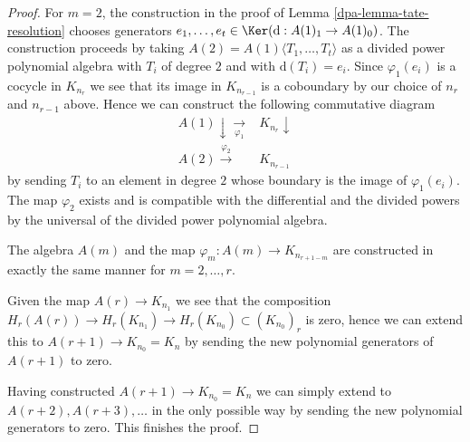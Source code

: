 \begin{proof}
\medskip\noindent
For $m = 2$, the construction in the proof of Lemma \ref{dpa-lemma-tate-resolution}
chooses generators $e_1, \ldots, e_t \in \Ker(\text{d} : A(1)_1 \to A(1)_0)$.
The construction proceeds by taking
$A(2) = A(1)\langle T_1, \ldots, T_t\rangle$
as a divided power polynomial algebra with $T_i$ of degree $2$
and with $\text{d}(T_i) = e_i$.
Since $\varphi_1(e_i)$ is a cocycle in $K_{n_r}$
we see that its image in $K_{n_{r - 1}}$ is a coboundary by
our choice of $n_r$ and $n_{r - 1}$ above.
Hence we can construct the following commutative diagram
$$
\begin{array}{cc}A(1) \downarrow\underset{\varphi_1}{\longrightarrow} & K_{n_r} \downarrow \\ A(2) \overset{\varphi_2}{\longrightarrow} & K_{n_{r - 1}}\end{array}
$$
by sending $T_i$ to an element in degree $2$ whose boundary is the
image of $\varphi_1(e_i)$. The map $\varphi_2$ exists and is compatible
with the differential and the divided powers by the universal
of the divided power polynomial algebra.

\medskip\noindent
The algebra $A(m)$ and the map $\varphi_m : A(m) \to K_{n_{r + 1 - m}}$
are constructed in exactly the same manner for $m = 2, \ldots, r$.

\medskip\noindent
Given the map $A(r) \to K_{n_1}$ we see that the composition
$H_r(A(r)) \to H_r(K_{n_1}) \to H_r(K_{n_0}) \subset (K_{n_0})_r$
is zero, hence we can extend this to $A(r + 1) \to K_{n_0} = K_n$
by sending the new polynomial generators of $A(r + 1)$ to zero.

\medskip\noindent
Having constructed $A(r + 1) \to K_{n_0} = K_n$ we can simply
extend to $A(r + 2), A(r + 3), \ldots$ in the only possible way
by sending the new polynomial generators to zero.
This finishes the proof.
\end{proof}

